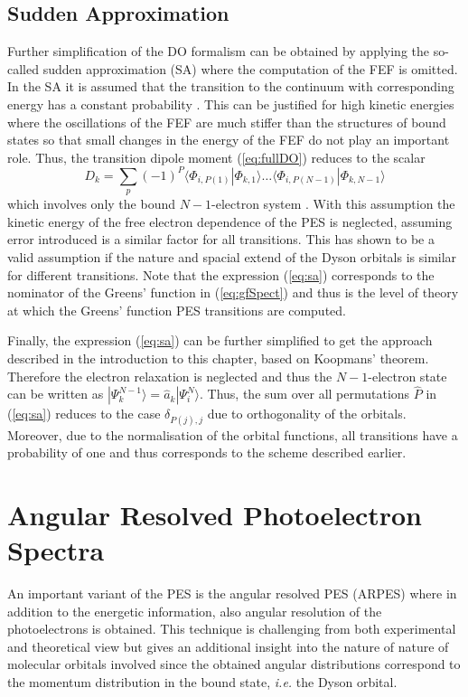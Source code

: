 \subsection{Sudden Approximation}
\label{ch:sa}
Further simplification of the DO formalism can be obtained by applying the so-called sudden approximation (SA) where the computation of the FEF is omitted.
In the SA it is assumed that the transition to the continuum with corresponding energy has a constant probability \cite{saGonzales}.
This can be justified for high kinetic energies where the oscillations of the FEF are much stiffer than the structures of bound states so that small changes in the energy of the FEF do not play an important role.
Thus, the transition dipole moment (\ref{eq:fullDO}) reduces to the scalar
\begin{equation} \label{eq:sa}
D_k= \sum_p (-1)^P \langle \Phi_{i,P(1)}  |\Phi_{k,1} \rangle
           \hdots  \langle \Phi_{i,P(N-1)}|\Phi_{k,N-1} \rangle
\end{equation}
which involves only the bound $N-1$-electron system \cite{saAberg}.
With this assumption the kinetic energy of the free electron dependence of the PES is neglected, assuming error introduced is a similar factor for all transitions.
This has shown to be a valid assumption if the nature and spacial extend of the Dyson orbitals is similar for different transitions.
Note that the expression (\ref{eq:sa}) corresponds to the nominator of the Greens' function in (\ref{eq:gfSpect}) and thus is the level of theory at which the Greens' function PES transitions are computed.

Finally, the expression (\ref{eq:sa}) can be further simplified to get the approach described in the introduction to this chapter, based on Koopmans' theorem.
Therefore the electron relaxation is neglected and thus the $N-1$-electron state can be written as $|\Psi_{k}^{N-1}\rangle= \hat{a}_k|\Psi_i^N\rangle$. 
Thus, the sum over all permutations $\hat{P}$ in (\ref{eq:sa}) reduces to the case $\delta_{P(j),j}$ due to orthogonality of the orbitals.
Moreover, due to the normalisation of the orbital functions, all transitions have a probability of one and thus corresponds to the scheme described earlier.

\section{Angular Resolved Photoelectron Spectra}
An important variant of the PES is the angular resolved PES (ARPES) where in addition to the energetic information, also angular resolution of the photoelectrons is obtained.
This technique is challenging from both experimental and theoretical view but gives an additional insight into the nature of nature of molecular orbitals involved since the obtained angular distributions correspond to the momentum distribution in the bound state, \textit{i.e.} the Dyson orbital.

